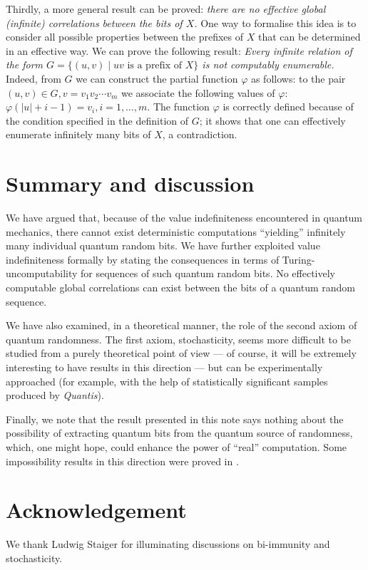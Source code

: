\documentclass[pra,amsfonts,preprint,showkeys]{revtex4}
\begin{document}
Thirdly,  a more general result can be proved: {\it there are no
effective global (infinite) correlations between the bits of $X$.} One way to formalise this idea is to consider all possible properties between
the prefixes of $X$ that can be determined in an effective way. We can prove
the following result: {\it Every infinite relation of the form
$G =\{(u,v)\mid uv \mbox{  is a prefix of } X\}$ is not computably enumerable.}   Indeed, from $G$ we can construct the partial function
$\varphi$ as follows: to the pair $(u,v)\in G, v = v_{1}v_{2}\cdots v_{m}$ we associate the following values of $\varphi$: $\varphi (|u| + i-1)= v_{i}, i= 1, \ldots ,m. $ The function $\varphi$ is correctly defined because of the condition specified in the definition of $G$; it shows that
one can effectively enumerate  infinitely many bits of $X$, a contradiction.




\section{Summary and discussion}


We have argued that, because of the value indefiniteness encountered
in quantum mechanics, there cannot exist deterministic computations
``yielding''
infinitely many
individual quantum random bits.
We have further exploited value indefiniteness formally by stating the consequences
in terms of Turing-uncomputability for sequences of such quantum random bits.
No effectively computable global correlations can exist between the bits of a
quantum random sequence.



We have also examined,
in a theoretical manner,
the role of the second axiom of quantum randomness.
The first axiom, stochasticity,
seems more difficult to be studied from a purely theoretical point of view
--- of course, it will be extremely interesting to have results in this direction ---
but can be experimentally approached
(for example, with the help of statistically significant samples produced by {\it Quantis}).


Finally, we note that the result presented in this note says nothing about the possibility of extracting  quantum bits from the
quantum source of randomness, which, one might hope, could enhance
the power of ``real'' computation. Some impossibility results in this direction were proved in \cite{dodis-renner}.

\section*{Acknowledgement} We thank Ludwig Staiger for illuminating discussions on bi-immunity and stochasticity.
\end{document}
